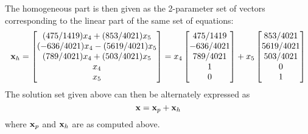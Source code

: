 \documentclass{ximera}
\begin{document}
\begin{example}
\[\]
The homogeneous part is then given as the 2-parameter set of vectors corresponding to the linear part of the same set of equations:
\[
{\bf x}_h = 
\begin{bmatrix}
(475/1419)x_4 + (853/4021)x_5\\
(-636/4021)x_4 - (5619/4021)x_5\\
(789/4021)x_4 + (503/4021)x_5\\
x_4\\
x_5
\end{bmatrix} = x_4 \begin{bmatrix}
475/1419\\ -636/4021\\ 789/4021\\ 1\\ 0
\end{bmatrix} + x_5 \begin{bmatrix}
853/4021\\ 5619/4021\\ 503/4021\\ 0\\ 1
\end{bmatrix}
\]
The solution set given above can then be alternately expressed as
\[
{\bf x} = {\bf x}_p + {\bf x}_h
\]
where ${\bf x}_p$ and ${\bf x}_h$ are as computed above.
\end{example}
\end{document}
